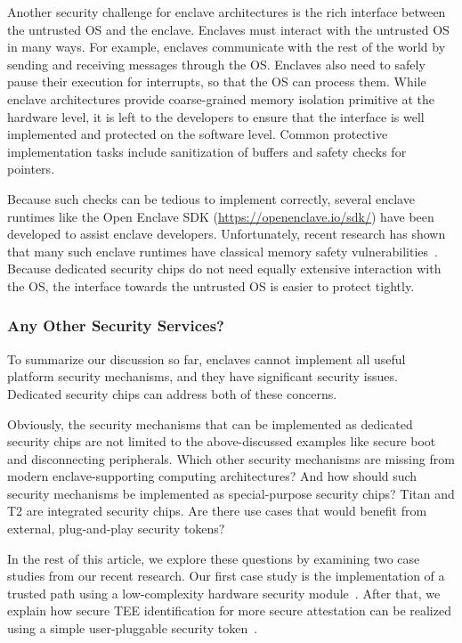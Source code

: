 Another security challenge for enclave architectures is the rich interface between the untrusted OS and the enclave. Enclaves must interact with the untrusted OS in many ways. For example, enclaves communicate with the rest of the world by sending and receiving messages through the OS. Enclaves also need to safely pause their execution for interrupts, so that the OS can process them. While enclave architectures provide coarse-grained memory isolation primitive at the hardware level, it is left to the developers to ensure that the interface is well implemented and protected on the software level. Common protective implementation tasks include sanitization of buffers and safety checks for pointers. 

Because such checks can be tedious to implement correctly, several enclave runtimes like the Open Enclave SDK (\url{https://openenclave.io/sdk/}) have been developed to assist enclave developers. Unfortunately, recent research has shown that many such enclave runtimes have classical memory safety vulnerabilities~\cite{van2019tale}. Because dedicated security chips do not need equally extensive interaction with the OS, the interface towards the untrusted OS is easier to protect tightly. 


\subsubsection*{Any Other Security Services?}

To summarize our discussion so far, enclaves cannot implement all useful platform security mechanisms, and they have significant security issues. Dedicated security chips can address both of these concerns. 

Obviously, the security mechanisms that can be implemented as dedicated security chips are not limited to the above-discussed examples like secure boot and disconnecting peripherals. Which other security mechanisms are missing from modern enclave-supporting computing architectures? And how should such security mechanisms be implemented as special-purpose security chips? Titan and T2 are integrated security chips. Are there use cases that would benefit from external, plug-and-play security tokens?

In the rest of this article, we explore these questions by examining two case studies from our recent research. Our first case study is the implementation of a trusted path using a low-complexity hardware security module~\cite{protection}. After that, we explain how secure TEE identification for more secure attestation can be realized using a simple user-pluggable security token~\cite{proximitee}.
